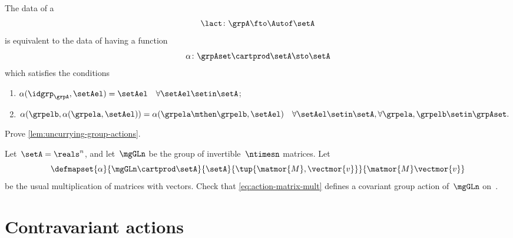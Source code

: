 \begin{lemma}
    \label{lem:uncurrying-group-actions}
    The data of a 
    \begin{equation}
        \lact \colon \grpA \fto \Autof\setA
    \end{equation}
    is equivalent to the data of having a function
    \begin{equation}
        \alpha \colon \grpAset \cartprod \setA \sto \setA
    \end{equation}
    which satisfies the conditions
    \begin{enumerate}
        \item $ \alpha (\idgrp_\grpA, \setAel) = \setAel \quad \forall \setAel \setin \setA$;
        \item $ \alpha (\grpelb, \alpha(\grpela, \setAel)) = \alpha (\grpela \mthen \grpelb, \setAel) \quad \forall \setAel \setin \setA, \forall \grpela, \grpelb \setin \grpAset.
              $
    \end{enumerate}
\end{lemma}

\vfill%


\begin{gradedexercise}
    \label{ex:UncurryingGroupActions}
    Prove \cref{lem:uncurrying-group-actions}.
\end{gradedexercise}

\begin{gradedexercise}
    \label{ex:MatrixMultAction}
    Let~$\setA = \reals^n$, and let~$\mgGLn$ be the group of invertible~$\ntimesn$ matrices.
    Let
    \begin{equation}
        \label{eq:action-matrix-mult}
        \defmapset{
            \alpha
        }{
            \mgGLn \cartprod \setA
        }{
            \setA
        }{
            \tup{\matmor{M}, \vectmor{v}}
        }{
            \matmor{M}\vectmor{v}
        }
    \end{equation}
    be the usual multiplication of matrices with vectors.
    Check that \cref{eq:action-matrix-mult} defines a covariant group action of~$\mgGLn$ on~\setA.
\end{gradedexercise}


\section{Contravariant actions}

